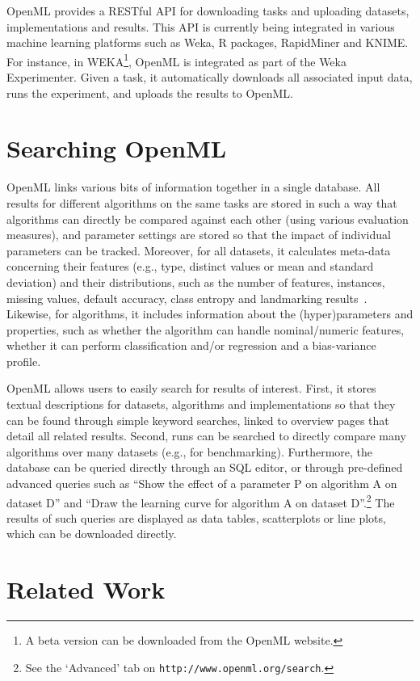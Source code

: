 \documentclass{llncs}
\begin{document}
OpenML provides a RESTful API for downloading tasks and uploading datasets, implementations and results. This API is currently being integrated in various machine learning platforms such as Weka, R packages, RapidMiner and KNIME. For instance, in WEKA\footnote{A beta version can be downloaded from the OpenML website.}, OpenML is integrated as part of the Weka Experimenter. Given a task, it automatically downloads all associated input data, runs the experiment, and uploads the results to OpenML.

\section{Searching OpenML}

OpenML links various bits of information together in a single database. All results for different algorithms on the same tasks are stored in such a way that algorithms can directly be compared against each other (using various evaluation measures), and parameter settings are stored so that the impact of individual parameters can be tracked.
Moreover, for all datasets, it calculates meta-data concerning their features (e.g., type, distinct values or mean and standard deviation) and their distributions, such as the number of features, instances, missing values, default accuracy, class entropy and landmarking results~\cite{Peng2002}. Likewise, for algorithms, it includes information about the (hyper)parameters and properties, such as whether the algorithm can handle nominal/numeric features, whether it can perform classification and/or regression and a bias-variance profile.

OpenML allows users to easily search for results of interest. First, it stores textual descriptions for datasets, algorithms and implementations so that they can be found through simple keyword searches, linked to overview pages that detail all related results. Second, runs can be searched to directly compare many algorithms over many datasets (e.g., for benchmarking). Furthermore, the database can be queried directly through an SQL editor, or through pre-defined advanced queries such as ``Show the effect of a parameter P on algorithm A on dataset D'' and ``Draw the learning curve for algorithm A on dataset D''.\footnote{See the `Advanced' tab on \texttt{http://www.openml.org/search}.} The results of such queries are displayed as data tables, scatterplots or line plots, which can be downloaded directly.

\section{Related Work}
\end{document}
